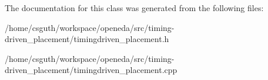The documentation for this class was generated from the following files\-:\begin{DoxyCompactItemize}
\item 
/home/csguth/workspace/openeda/src/timing-\/driven\-\_\-placement/timingdriven\-\_\-placement.\-h\item 
/home/csguth/workspace/openeda/src/timing-\/driven\-\_\-placement/timingdriven\-\_\-placement.\-cpp\end{DoxyCompactItemize}
